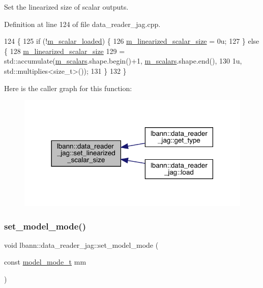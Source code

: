 Set the linearized size of scalar outputs. 



Definition at line 124 of file data\+\_\+reader\+\_\+jag.\+cpp.


\begin{DoxyCode}
124                                                  \{
125   \textcolor{keywordflow}{if} (!\hyperlink{classlbann_1_1data__reader__jag_add9f037609b73da931a4a8a460798db9}{m\_scalar\_loaded}) \{
126     \hyperlink{classlbann_1_1data__reader__jag_a856b4b9cdf9d8569e5fef1d5d996870d}{m\_linearized\_scalar\_size} = 0u;
127   \} \textcolor{keywordflow}{else} \{
128     \hyperlink{classlbann_1_1data__reader__jag_a856b4b9cdf9d8569e5fef1d5d996870d}{m\_linearized\_scalar\_size}
129       = std::accumulate(\hyperlink{classlbann_1_1data__reader__jag_ab0ce0a57903e79f029e91356db8b5441}{m\_scalars}.shape.begin()+1, \hyperlink{classlbann_1_1data__reader__jag_ab0ce0a57903e79f029e91356db8b5441}{m\_scalars}.shape.end(),
130                         1u, std::multiplies<size\_t>());
131   \}
132 \}
\end{DoxyCode}
Here is the caller graph for this function\+:\nopagebreak
\begin{figure}[H]
\begin{center}
\leavevmode
\includegraphics[width=318pt]{classlbann_1_1data__reader__jag_a27a1da4475453b043ba0ec1724317c27_icgraph}
\end{center}
\end{figure}
\mbox{\label{classlbann_1_1data__reader__jag_a143e41b76858ffb6606bafb376c09418}} 
\subsubsection{\texorpdfstring{set\+\_\+model\+\_\+mode()}{set\_model\_mode()}}
{\footnotesize\ttfamily void lbann\+::data\+\_\+reader\+\_\+jag\+::set\+\_\+model\+\_\+mode (\begin{DoxyParamCaption}\item[{const \hyperlink{classlbann_1_1data__reader__jag_a114c369c8604df385cf7a3ec20c9739b}{model\+\_\+mode\+\_\+t}}]{mm }\end{DoxyParamCaption})}



